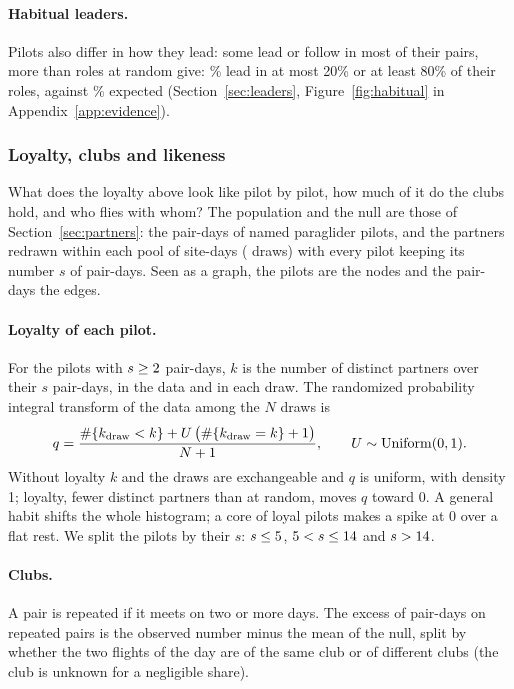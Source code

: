 \paragraph{Habitual leaders.} Pilots also differ in how they lead: some lead or follow in most of
their pairs, more than roles at random give: \HabitualExtreme\% lead in at most 20\% or at least 80\% of
their roles, against \HabitualExtremeNull\% expected (Section~\ref{sec:leaders},
Figure~\ref{fig:habitual} in Appendix~\ref{app:evidence}).

\subsubsection{Loyalty, clubs and likeness}\label{sec:network}

What does the loyalty above look like pilot by pilot, how much of it do the clubs hold, and who
flies with whom? The population and the null are those of Section~\ref{sec:partners}: the
pair-days of named paraglider pilots, and the partners redrawn within each pool of site-days
(\StNwDraws{} draws) with every pilot keeping its number $s$ of pair-days. Seen as a graph, the
pilots are the nodes and the pair-days the edges.

\paragraph{Loyalty of each pilot.} For the \StNwPilots{} pilots with $s\ge2$ pair-days, $k$
is the number of distinct partners over their $s$ pair-days, in the data and in each draw. The
randomized probability integral transform of the data among the $N$ draws is
\begin{equation}\label{eq:pit}
q=\frac{\#\{k_{\rm draw}<k\}+U\,\big(\#\{k_{\rm draw}=k\}+1\big)}{N+1},\qquad U\sim\mathrm{Uniform}(0,1).
\end{equation}
Without loyalty $k$ and the draws are exchangeable and $q$ is uniform, with density 1; loyalty,
fewer distinct partners than at random, moves $q$ toward 0. A general habit shifts the whole
histogram; a core of loyal pilots makes a spike at 0 over a flat rest. We split the pilots by their
$s$: $s\le5$, $5<s\le14$ and $s>14$.

\paragraph{Clubs.} A pair is repeated if it meets on two or more days. The excess of pair-days on
repeated pairs is the observed number minus the mean of the null, split by whether the two flights
of the day are of the same club or of different clubs (the club is unknown for a negligible share).

